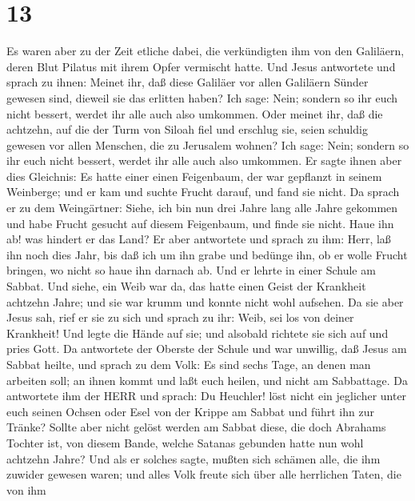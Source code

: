 \hypertarget{section-12}{%
\section{13}\label{section-12}}

 Es waren aber zu der Zeit etliche dabei, die verkündigten
ihm von den Galiläern, deren Blut Pilatus mit ihrem Opfer vermischt
hatte.  Und Jesus antwortete und sprach zu ihnen: Meinet
ihr, daß diese Galiläer vor allen Galiläern Sünder gewesen sind, dieweil
sie das erlitten haben?  Ich sage: Nein; sondern so ihr euch
nicht bessert, werdet ihr alle auch also umkommen.  Oder
meinet ihr, daß die achtzehn, auf die der Turm von Siloah fiel und
erschlug sie, seien schuldig gewesen vor allen Menschen, die zu
Jerusalem wohnen?  Ich sage: Nein; sondern so ihr euch nicht
bessert, werdet ihr alle auch also umkommen.  Er sagte ihnen
aber dies Gleichnis: Es hatte einer einen Feigenbaum, der war gepflanzt
in seinem Weinberge; und er kam und suchte Frucht darauf, und fand sie
nicht.  Da sprach er zu dem Weingärtner: Siehe, ich bin nun
drei Jahre lang alle Jahre gekommen und habe Frucht gesucht auf diesem
Feigenbaum, und finde sie nicht. Haue ihn ab! was hindert er das Land?
 Er aber antwortete und sprach zu ihm: Herr, laß ihn noch
dies Jahr, bis daß ich um ihn grabe und bedünge ihn,  ob er
wolle Frucht bringen, wo nicht so haue ihn darnach ab.  Und
er lehrte in einer Schule am Sabbat.  Und siehe, ein Weib
war da, das hatte einen Geist der Krankheit achtzehn Jahre; und sie war
krumm und konnte nicht wohl aufsehen.  Da sie aber Jesus
sah, rief er sie zu sich und sprach zu ihr: Weib, sei los von deiner
Krankheit!  Und legte die Hände auf sie; und alsobald
richtete sie sich auf und pries Gott.  Da antwortete der
Oberste der Schule und war unwillig, daß Jesus am Sabbat heilte, und
sprach zu dem Volk: Es sind sechs Tage, an denen man arbeiten soll; an
ihnen kommt und laßt euch heilen, und nicht am Sabbattage. 
Da antwortete ihm der HERR und sprach: Du Heuchler! löst nicht ein
jeglicher unter euch seinen Ochsen oder Esel von der Krippe am Sabbat
und führt ihn zur Tränke?  Sollte aber nicht gelöst werden
am Sabbat diese, die doch Abrahams Tochter ist, von diesem Bande, welche
Satanas gebunden hatte nun wohl achtzehn Jahre?  Und als er
solches sagte, mußten sich schämen alle, die ihm zuwider gewesen waren;
und alles Volk freute sich über alle herrlichen Taten, die von ihm
